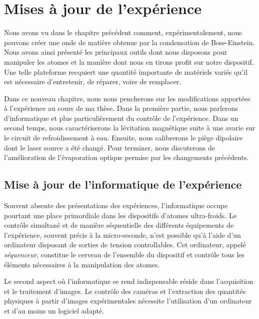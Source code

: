 \chapter{Mises à jour de l'expérience}
\label{ch:new_exp}

Nous avons vu dans le chapitre précédent comment, expérimentalement, nous pouvons créer une onde de matière obtenue par la condensation de Bose-Einstein. Nous avons ainsi présenté les principaux outils dont nous disposons pour manipuler les atomes et la manière dont nous en tirons profit sur notre dispositif. Une telle plateforme recquiert une quantité importante de matériels variés qu'il est nécessaire d'entretenir, de réparer, voire de remplacer. 

Dans ce nouveau chapitre, nous nous pencherons sur les modifications apportées à l'expérience au cours de ma thèse. Dans la première partie, nous parlerons d'informatique et plus particulièrement du contrôle de l'expérience. Dans un second temps, nous caractériserons la lévitation magnétique suite à une avarie sur le circuit de refroidissement à eau. Ensuite, nous calibrerons le piège dipolaire dont le laser source a été changé. Pour terminer, nous discuterons de l'amélioration de l'évaporation optique permise par les changements précédents.

\section{Mise à jour de l'informatique de l'expérience}
Souvent absente des présentations des expériences, l'informatique occupe pourtant une place primordiale dans les dispositifs d'atomes ultra-froids. Le contrôle simultané et de manière séquentielle des différents équipements de l'expérience, souvent précis à la micro-seconde, n'est possible qu'à l'aide d'un ordinateur disposant de sorties de tension controllables. Cet ordinateur, appelé \emph{séquenceur}, constitue le cerveau de l'ensemble du dispositif et contrôle tous les éléments nécessaires à la manipulation des atomes.

Le second aspect où l'informatique se rend indispensable réside dans l'acquisition et le traitement d'images. Le contrôle des caméras et l'extraction des quantités physiques à partir d'images expérimentales nécessite l'utilisation d'un ordinateur et d'au moins un logiciel adapté. 


